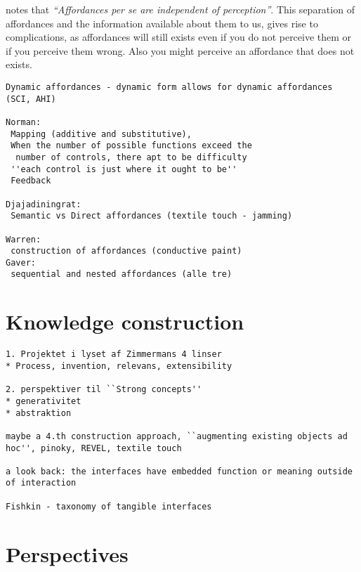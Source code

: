 \citet{gaver1991technology} notes that \emph{``Affordances per se are independent of perception''}.
This separation of affordances and the information available about them to us, gives rise to complications, as affordances will still exists even if you do not perceive them or if you perceive them wrong.
Also you might perceive an affordance that does not exists.
\blank
{}
\begin{verbatim}
Dynamic affordances - dynamic form allows for dynamic affordances (SCI, AHI)

Norman: 
 Mapping (additive and substitutive), 
 When the number of possible functions exceed the 
  number of controls, there apt to be difficulty
 ''each control is just where it ought to be''
 Feedback 

Djajadiningrat:
 Semantic vs Direct affordances (textile touch - jamming)

Warren:
 construction of affordances (conductive paint) 
Gaver:
 sequential and nested affordances (alle tre)
\end{verbatim}


\section{Knowledge construction}

\begin{verbatim}
1. Projektet i lyset af Zimmermans 4 linser
* Process, invention, relevans, extensibility

2. perspektiver til ``Strong concepts''
* generativitet
* abstraktion

maybe a 4.th construction approach, ``augmenting existing objects ad hoc'', pinoky, REVEL, textile touch

a look back: the interfaces have embedded function or meaning outside of interaction

Fishkin - taxonomy of tangible interfaces
\end{verbatim}

\section{Perspectives}

